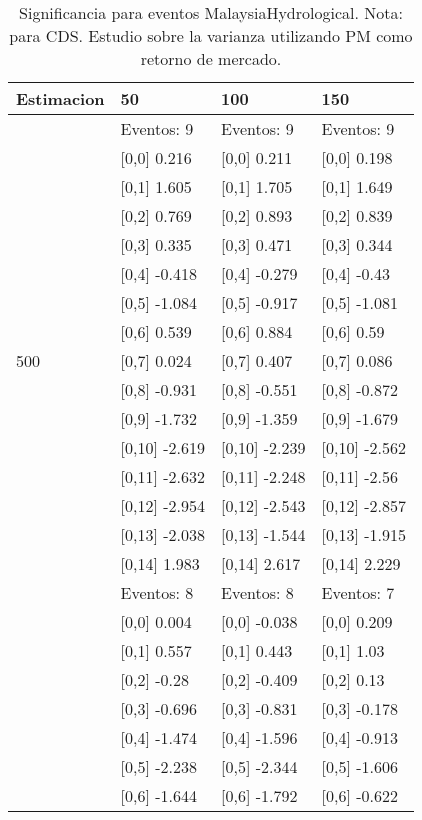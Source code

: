 \begin{table}

\caption{Significancia para eventos MalaysiaHydrological. Nota: para CDS. Estudio sobre la varianza utilizando PM como retorno de mercado.}
\centering
\begin{tabular}[t]{llll}
\toprule
Estimacion & 50 & 100 & 150\\
\midrule
 & Eventos:  9 & Eventos:  9 & Eventos:  9\\
 & {}[0,0] 0.216 & {}[0,0] 0.211 & {}[0,0] 0.198\\
 & {}[0,1] 1.605 & {}[0,1] 1.705 & {}[0,1] 1.649\\
 & {}[0,2] 0.769 & {}[0,2] 0.893 & {}[0,2] 0.839\\
 & {}[0,3] 0.335 & {}[0,3] 0.471 & {}[0,3] 0.344\\
\addlinespace
 & {}[0,4] -0.418 & {}[0,4] -0.279 & {}[0,4] -0.43\\
 & {}[0,5] -1.084 & {}[0,5] -0.917 & {}[0,5] -1.081\\
 & {}[0,6] 0.539 & {}[0,6] 0.884 & {}[0,6] 0.59\\
500 & {}[0,7] 0.024 & {}[0,7] 0.407 & {}[0,7] 0.086\\
 & {}[0,8] -0.931 & {}[0,8] -0.551 & {}[0,8] -0.872\\
\addlinespace
 & {}[0,9] -1.732 & {}[0,9] -1.359 & {}[0,9] -1.679\\
 & {}[0,10] -2.619 & {}[0,10] -2.239 & {}[0,10] -2.562\\
 & {}[0,11] -2.632 & {}[0,11] -2.248 & {}[0,11] -2.56\\
 & {}[0,12] -2.954 & {}[0,12] -2.543 & {}[0,12] -2.857\\
 & {}[0,13] -2.038 & {}[0,13] -1.544 & {}[0,13] -1.915\\
\addlinespace
 & {}[0,14] 1.983 & {}[0,14] 2.617 & {}[0,14] 2.229\\
 & Eventos:  8 & Eventos:  8 & Eventos:  7\\
 & {}[0,0] 0.004 & {}[0,0] -0.038 & {}[0,0] 0.209\\
 & {}[0,1] 0.557 & {}[0,1] 0.443 & {}[0,1] 1.03\\
 & {}[0,2] -0.28 & {}[0,2] -0.409 & {}[0,2] 0.13\\
\addlinespace
 & {}[0,3] -0.696 & {}[0,3] -0.831 & {}[0,3] -0.178\\
 & {}[0,4] -1.474 & {}[0,4] -1.596 & {}[0,4] -0.913\\
 & {}[0,5] -2.238 & {}[0,5] -2.344 & {}[0,5] -1.606\\
 & {}[0,6] -1.644 & {}[0,6] -1.792 & {}[0,6] -0.622\\

\end{tabular}
\end{table}
